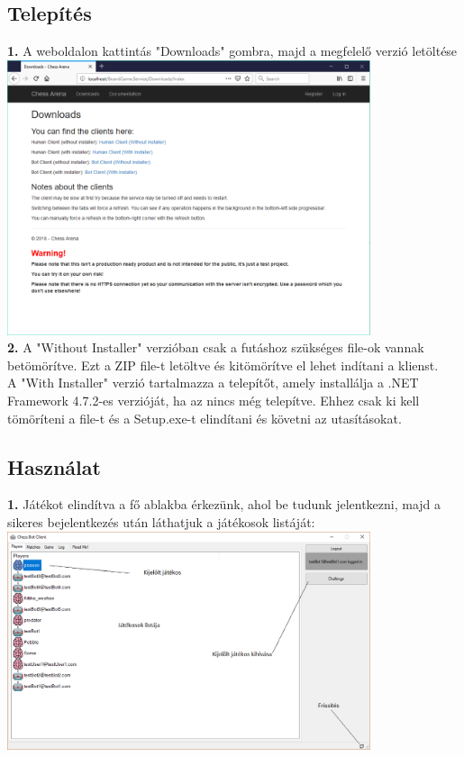 \documentclass[twoside, a4paper, 12pt]{article}
\begin{document}
\subsection{Telepítés}
\noindent \textbf{1.} A weboldalon kattintás "Downloads" gombra, majd a megfelelő verzió letöltése \\
\includegraphics[width=0.8\textwidth]{img/service_downloads.png} \\
\noindent \textbf{2.} A "Without Installer" verzióban csak a futáshoz szükséges file-ok vannak betömörítve. Ezt a ZIP file-t letöltve és kitömörítve el lehet indítani a klienst. \\
A "With Installer" verzió tartalmazza a telepítőt, amely installálja a .NET Framework 4.7.2-es verzióját, ha az nincs még telepítve. Ehhez csak ki kell tömöríteni a file-t és a Setup.exe-t elindítani és követni az utasításokat.
\subsection{Használat}
\noindent \textbf{1.} Játékot elindítva a fő ablakba érkezünk, ahol be tudunk jelentkezni, majd a sikeres bejelentkezés után láthatjuk a játékosok listáját: \\
\includegraphics[width=0.8\textwidth]{img/botClient_1.png} \\
\end{document}
